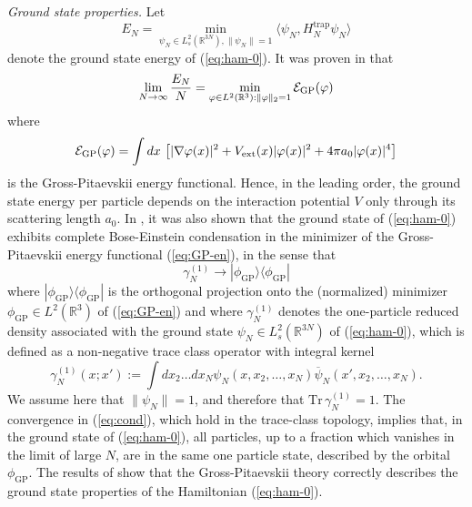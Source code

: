 \documentclass[11pt,a4paper]{article}
\newcommand{\bR}{{\mathbb R}}
\newcommand{\tr}{\mbox{Tr}}
\newcommand{\cE}{{\cal E}}
\begin{document}
{\it Ground state properties.} Let \[ E_N = \min_{\psi_N \in L^2_s (\bR^{3N}), \| \psi_N \| = 1} \langle \psi_N , H^{\text{trap}}_N \psi_N \rangle \]
denote the ground state energy of (\ref{eq:ham-0}). It was proven in \cite{LSY} that
\[ \lim_{N \to \infty} \frac{E_N}{N} = \min_{\varphi \in L^2 (\bR^3) : \| \varphi \|_2 = 1} \cE_{\text{GP}} (\varphi) \]
where 
\begin{equation}\label{eq:GP-en} \cE_{\text{GP}} (\varphi) = \int dx \, \left[ |\nabla \varphi (x)|^2 + V_{\text{ext}} (x) |\varphi (x)|^2 + 4 \pi a_0 |\varphi (x)|^4 \right] \end{equation}
is the Gross-Pitaevskii energy functional. Hence, in the leading order, the ground state energy per particle depends on the interaction potential $V$ only through its scattering length $a_0$. In \cite{LS}, it was also shown that the ground state of (\ref{eq:ham-0}) exhibits complete Bose-Einstein condensation in the minimizer of the Gross-Pitaevskii energy functional (\ref{eq:GP-en}),
in the sense that 
\begin{equation}\label{eq:cond} \gamma_N^{(1)} \to | \phi_{\text{GP}} \rangle \langle \phi_{\text{GP}}| \end{equation}
where $|\phi_{\text{GP}} \rangle \langle \phi_{\text{GP}} |$ is the orthogonal projection onto the (normalized) 
minimizer $\phi_{\text{GP}} \in L^2 (\bR^3)$ of (\ref{eq:GP-en}) and where $\gamma^{(1)}_N$ denotes the one-particle reduced density associated with the ground state $\psi_N \in L^2_s (\bR^{3N})$ of (\ref{eq:ham-0}), which is defined as a non-negative trace class operator with integral kernel
\begin{equation}\label{eq:one-red} \gamma^{(1)}_N (x;x') := \int dx_2 \dots
dx_N \psi_N (x , x_2, \dots  ,x_N) \overline{\psi}_N (x' , x_2 , \dots ,
x_N). \end{equation}
We assume here that $\| \psi_N \|  =1$, and therefore that $\tr \, \gamma^{(1)}_N = 1$. The convergence in (\ref{eq:cond}), which hold in the trace-class topology, implies that, in the ground state of (\ref{eq:ham-0}), all particles, up to a fraction which vanishes in the limit of large $N$, are in the same one particle state, described by the orbital $\phi_{\text{GP}}$. The results of \cite{LSY,LS} show that the Gross-Pitaevskii theory correctly describes the ground state properties of the Hamiltonian (\ref{eq:ham-0}). 

\bigskip
\end{document}
